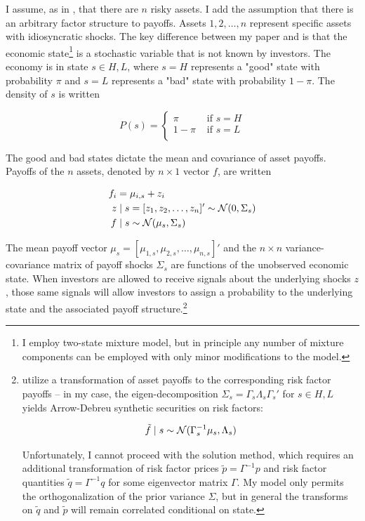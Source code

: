 \documentclass{article}
\begin{document}
I assume, as in \textcite{kacperczyk_rational_2016}, that there are $n$ risky assets. I add the assumption that there is an  arbitrary factor structure to payoffs. Assets $1,2,\dots,n$ represent specific assets with idiosyncratic shocks. The key difference between my paper and \textcite{kacperczyk_rational_2016} is that the economic state\footnote{I employ two-state mixture model, but in principle any number of mixture components can be employed with only minor modifications to the model.} is a stochastic variable that is not known by investors. The economy is in state $s \in {H, L}$, where $s=H$ represents a "good" state with probability $\pi$ and $s=L$ represents a "bad" state with probability $1-\pi$. The density of $s$ is written

$$
P(s) = \begin{cases}
    \pi & \text{ if } s = H \\
    1-\pi & \text{ if } s = L \\
\end{cases}
$$

The good and bad states dictate the mean and covariance of asset payoffs. Payoffs of the $n$ assets, denoted by $n\times 1$ vector $f$, are written

\begin{align}
    f_i &= \mu_{i,s} + z_i\\
    z &\mid s = [z_1,z_2, \dots, z_n]' \sim \mathcal{N}(0, \Sigma_s) \\
    f &\mid s \sim \mathcal{N}(\mu_{s}, \Sigma_s)
\end{align}

The mean payoff vector $\mu_s = [\mu_{1,s},\mu_{2,s},\dots,\mu_{n,s}]'$ and the  $n\times n$ variance-covariance matrix of payoff shocks $\Sigma_s$ are functions of the unobserved economic state. When investors are allowed to receive signals about the underlying shocks $z$, those same signals will allow investors to assign a probability to the underlying state and the associated payoff structure.\footnote{\textcite{kacperczyk_rational_2016} utilize a transformation of asset payoffs to the corresponding risk factor payoffs -- in my case, the eigen-decomposition $\Sigma_s = \Gamma_s \Lambda_s \Gamma_s'$ for $s \in {H,L}$ yields Arrow-Debreu synthetic securities on risk factors:

\begin{align}
    \tilde f \mid s \sim \mathcal{N}(\Gamma_s^{-1} \mu_s, \Lambda_s)
\end{align}

\noindent Unfortunately, I cannot proceed with the \textcite{kacperczyk_rational_2016} solution method, which requires an additional transformation of risk factor prices $\tilde p = \Gamma^{-1}p$ and risk factor quantities $\tilde q = \Gamma^{-1} q$ for some eigenvector matrix $\Gamma$. My model only permits the orthogonalization of the prior variance $\Sigma$, but in general the transforms on $\tilde q$ and $\tilde p$ will remain correlated conditional on state.
}
\end{document}
